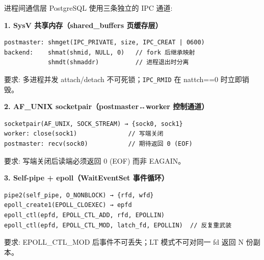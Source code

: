 \documentclass[aspectratio=169,10pt]{ctexbeamer}
\begin{document}

\begin{frame}[fragile,shrink=30]{进程间通信层}
PostgreSQL 使用三条独立的 IPC 通道:

\vspace{1mm}
\small
\textbf{1. SysV 共享内存（shared\_buffers 页缓存层）}

\begin{verbatim}
postmaster: shmget(IPC_PRIVATE, size, IPC_CREAT | 0600)
backend:    shmat(shmid, NULL, 0)   // fork 后继承映射
            shmdt(shmaddr)          // 进程退出时分离
\end{verbatim}

要求: 多进程并发 attach/detach 不可死锁；\texttt{IPC\_RMID} 在 nattch==0 时立即销毁。

\vspace{1mm}
\textbf{2. AF\_UNIX socketpair（postmaster↔worker 控制通道）}

\begin{verbatim}
socketpair(AF_UNIX, SOCK_STREAM) → {sock0, sock1}
worker: close(sock1)              // 写端关闭
postmaster: recv(sock0)           // 期待返回 0 (EOF)
\end{verbatim}

要求: 写端关闭后读端必须返回 0 (EOF) 而非 EAGAIN。

\vspace{1mm}
\textbf{3. Self-pipe + epoll（WaitEventSet 事件循环）}

\begin{verbatim}
pipe2(self_pipe, O_NONBLOCK) → {rfd, wfd}
epoll_create1(EPOLL_CLOEXEC) → epfd
epoll_ctl(epfd, EPOLL_CTL_ADD, rfd, EPOLLIN)
epoll_ctl(epfd, EPOLL_CTL_MOD, latch_fd, EPOLLIN)  // 反复重武装
\end{verbatim}

要求: EPOLL\_CTL\_MOD 后事件不可丢失；LT 模式不可对同一 fd 返回 N 份副本。
\end{frame}

\end{document}

